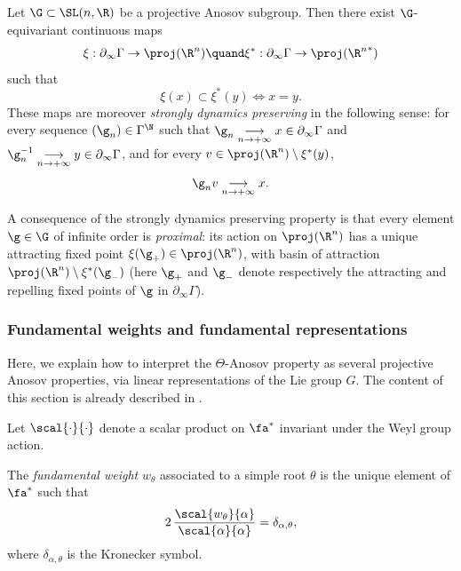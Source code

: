 \begin{theo} \label{theo - AnosovLimitMaps}
Let $\G\subset \SL(n,\R)$ be a projective Anosov subgroup. Then there exist $\G$-equivariant continuous maps\vspace*{-3pt}
\[
\xi: \partial_\infty \Gamma \to \proj(\R^n)\quand \xi^*: \partial_\infty \Gamma \to \proj({\R^n}^*)
\]
such that
\[\xi(x)\subset \xi^*(y) \iff x = y.\]
These maps are moreover \emph{strongly dynamics preserving} in the following sense: for every sequence $(\g_n)\in \Gamma^\N$ such that $\g_n\underset{n\to +\infty}{\longrightarrow} x \in \partial_\infty \Gamma$ and $\g_n^{-1}\underset{n\to +\infty}{\longrightarrow} y \in \partial_\infty \Gamma$, and for every $v\in \proj(\R^n) \setminus \xi^*(y)$,\vspace*{-3pt}
\[\g_n v \underset{n\to +\infty}{\longrightarrow} x.\]
\end{theo}
A consequence of the strongly dynamics preserving property is that every element $\g\in \G$ of infinite order is \emph{proximal}: its action on $\proj(\R^n)$ has a unique attracting fixed point $\xi(\g_+)\in \proj(\R^n)$, with basin of attraction $\proj(\R^n) \setminus \xi^*(\g_-)$ (here $\g_+$ and $\g_-$ denote respectively the attracting and repelling fixed points of $\g$ in $\partial_\infty \Gamma$).

\subsubsection{Fundamental weights and fundamental representations} \label{subsec - fundamental weights and fundamental representations}
Here, we explain how to interpret the $\Theta$-Anosov property as several projective Anosov properties, via linear representations of the Lie group $G$. The content of this section is already described in \cite[\S 3]{gueritaud20017anosov}.

Let $\scal{\cdot}{\cdot}$ denote a scalar product on $\fa^*$ invariant under the Weyl group action.
\begin{defi}
The \emph{fundamental weight} $w_\theta$ associated to a simple root $\theta$ is the unique element of $\fa^*$ such that\vspace*{-3pt}
\[2\,\frac{\scal{w_\theta}{\alpha}}{\scal{\alpha}{\alpha}}= \delta_{\alpha,\theta},\]
where $\delta_{\alpha,\theta}$ is the Kronecker symbol.
\end{defi}


